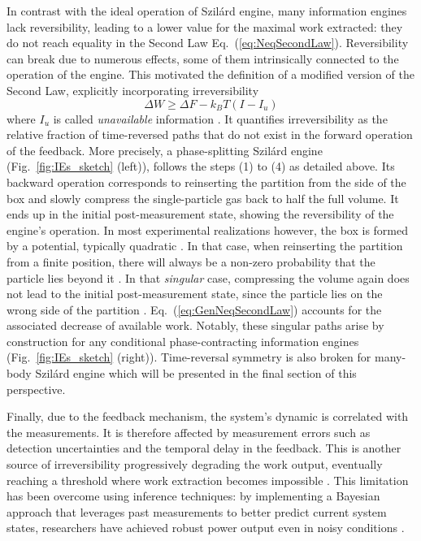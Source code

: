 \documentclass[aps, twocolumn,floatfix,showpacs, superscriptaddress]{revtex4-2}
\newcommand{\se}{Szil\'ard engine }
\begin{document}
In contrast with the ideal operation of Szil\'ard engine, many information engines lack reversibility, leading to a lower value for the maximal work extracted: they do not reach equality in the Second Law  Eq.~(\ref{eq:NeqSecondLaw}).
Reversibility can break due to numerous effects, some of them intrinsically connected to the operation of the engine.
This motivated the definition of a modified version of the Second Law, explicitly incorporating irreversibility
\begin{equation}
    \Delta W \geq \Delta F - k_B T (I - I_u)
    \label{eq:GenNeqSecondLaw}
\end{equation}
where $I_u$ is called \textit{unavailable} information \cite{ashida_general_2014}.
It quantifies irreversibility as the relative fraction of time-reversed paths that do not exist in the forward operation of the feedback.
More precisely, a phase-splitting Szil\'ard engine (Fig.~\ref{fig:IEs_sketch} (left)), follows the steps (1) to (4) as detailed above.
Its backward operation corresponds to reinserting the partition from the side of the box and slowly compress the single-particle gas back to half the full volume.
It ends up in the initial post-measurement state, showing the reversibility of the engine's operation.
In most experimental realizations however, the box is formed by a potential, typically quadratic \cite{roldan_universal_2014, toyabe_experimental_2010, Ribezzi_Crivellari_2019, archambault2024inertial}.
In that case, when reinserting the partition from a finite position, there will always be a non-zero probability that the particle lies beyond it \cite{archambault2024inertial}.
In that \textit{singular} case, compressing the volume again does not lead to the initial post-measurement state, since the particle lies on the wrong side of the partition \cite{Horowitz_2010, horowitz2011thermodynamic}.
Eq.~(\ref{eq:GenNeqSecondLaw}) accounts for the associated decrease of available work.
Notably, these singular paths arise by construction for any conditional phase-contracting information engines (Fig.~\ref{fig:IEs_sketch} (right)).
Time-reversal symmetry is also broken for many-body \se  \cite{horowitz2013optimizing, Chor2023} which will be presented in the final section of this perspective.



Finally, due to the feedback mechanism, the system's dynamic is correlated with the measurements.
It is therefore affected by measurement errors such as detection uncertainties and the temporal delay in the feedback.
This is another source of irreversibility progressively degrading the work output, eventually reaching a threshold where work extraction becomes impossible \cite{saha_bayesian_2022}. This limitation has been overcome using inference techniques: by implementing a Bayesian approach that leverages past measurements to better predict current system states, researchers have achieved robust power output even in noisy conditions \cite{saha_bayesian_2022}.
\end{document}
